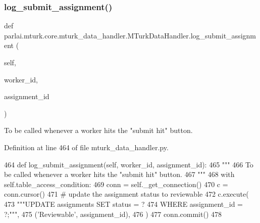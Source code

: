 \subsubsection{\texorpdfstring{log\+\_\+submit\+\_\+assignment()}{log\_submit\_assignment()}}
{\footnotesize\ttfamily def parlai.\+mturk.\+core.\+mturk\+\_\+data\+\_\+handler.\+M\+Turk\+Data\+Handler.\+log\+\_\+submit\+\_\+assignment (\begin{DoxyParamCaption}\item[{}]{self,  }\item[{}]{worker\+\_\+id,  }\item[{}]{assignment\+\_\+id }\end{DoxyParamCaption})}

\begin{DoxyVerb}To be called whenever a worker hits the "submit hit" button.
\end{DoxyVerb}
 

Definition at line 464 of file mturk\+\_\+data\+\_\+handler.\+py.


\begin{DoxyCode}
464     \textcolor{keyword}{def }log\_submit\_assignment(self, worker\_id, assignment\_id):
465         \textcolor{stringliteral}{"""}
466 \textcolor{stringliteral}{        To be called whenever a worker hits the "submit hit" button.}
467 \textcolor{stringliteral}{        """}
468         with self.table\_access\_condition:
469             conn = self.\_get\_connection()
470             c = conn.cursor()
471             \textcolor{comment}{# update the assignment status to reviewable}
472             c.execute(
473                 \textcolor{stringliteral}{"""UPDATE assignments SET status = ?}
474 \textcolor{stringliteral}{                         WHERE assignment\_id = ?;"""},
475                 (\textcolor{stringliteral}{'Reviewable'}, assignment\_id),
476             )
477             conn.commit()
478 
\end{DoxyCode}
\mbox{\label{classparlai_1_1mturk_1_1core_1_1mturk__data__handler_1_1MTurkDataHandler_a080c2ffbf861cfe6175491a7a0bdd0ce}} 
